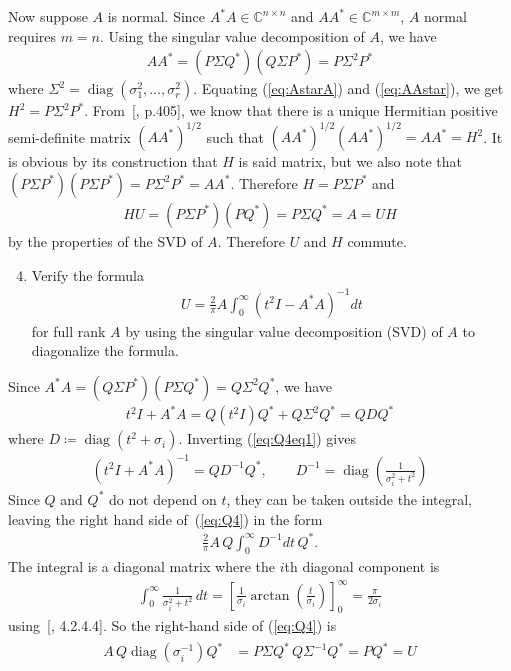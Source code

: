 \documentclass[10pt, A4paper]{article}
\DeclareMathOperator{\diag}{diag}
\begin{document}
Now suppose $A$ is normal. Since $A^*A \in \mathbb{C}^{n\times n}$ and
$AA^* \in \mathbb{C}^{m \times m}$, $A$ normal requires $m=n$.
Using the singular value decomposition of $A$, we have
\begin{align}
	AA^* = (P\Sigma Q^*) (Q\Sigma P^*) = P\Sigma^2 P^*
	\label{eq:AAstar}
\end{align}
where $\Sigma^2 = \diag(\sigma_1^2, \ldots,\sigma_r^2)$.
Equating (\ref{eq:AstarA}) and (\ref{eq:AAstar}), we get 
$H^2 = P\Sigma^2P^*$. From~[\citealp{hojo1985}, p.405], we know 
that there
is a unique Hermitian positive semi-definite matrix $(AA^*)^{1/2}$ such 
that $(AA^*)^{1/2}(AA^*)^{1/2} = AA^* = H^2$.
It is obvious by its construction that $H$ is said matrix, but we also
note that $(P\Sigma P^*) (P\Sigma P^*) = P \Sigma^2P^* = AA^*$.
Therefore $H = P\Sigma P^*$ and
\begin{align}
	HU = (P\Sigma P^*) (PQ^*) = P \Sigma Q^* = A = UH
\end{align}
by the properties of the SVD of $A$. Therefore $U$ and $H$ commute.
 

\vspace{0.2cm}
\begin{enumerate}
	\setcounter{enumi}{3}
	\item Verify the formula
	\begin{align*}
		U = \frac{2}{\pi}A \int_{0}^{\infty} (t^2I - A^*A)^{-1}dt
		\tag{*}
		\label{eq:Q4}
	\end{align*}
	for full rank $A$ by using the singular value decomposition (SVD)
	of $A$ to diagonalize the formula.
\end{enumerate}

Since $A^*A = (Q\Sigma P^*)(P\Sigma Q^*) = Q\Sigma^2Q^*$, we have
\begin{align}
	t^2I + A^*A = Q(t^2I)Q^* + Q \Sigma^2Q^* = QDQ^*
	\label{eq:Q4eq1}
\end{align}
where $D \coloneqq \diag(t^2 + \sigma_i)$.
Inverting (\ref{eq:Q4eq1}) gives
\begin{align}
	(t^2I + A^*A)^{-1} = QD^{-1}Q^*, \qquad
	D^{-1} = \diag\left(\frac{1}{\sigma_i^2 + t^2} \right)
\end{align}
Since $Q$ and $Q^*$ do not depend on $t$, they can be taken outside the 
integral, leaving the right hand side of~(\ref{eq:Q4}) in the form
\begin{align}
	\frac{2}{\pi} A\, Q\int_{0}^{\infty}D^{-1}dt\, Q^*.
\end{align}
The integral is a diagonal matrix where the $i$th diagonal component is
\begin{align}
	\int_{0}^{\infty} \frac{1}{\sigma_i^2 + t^2} \, dt =
	\left[\frac{1}{\sigma_i} \arctan \left(\frac{t}{\sigma_i}\right)
	\right]_0^{\infty} = \frac{\pi}{2\sigma_i}
\end{align}
using~[\citealp{jeda2008}, 4.2.4.4]. So the right-hand side of 
(\ref{eq:Q4}) is
\begin{align}
	\begin{split}
	A\,Q\diag\left(\sigma_i^{-1}\right)Q^*&=
	P\Sigma Q^* \, Q \Sigma^{-1}Q^* = PQ^* = U 
	\end{split}
\end{align}
\end{document}
